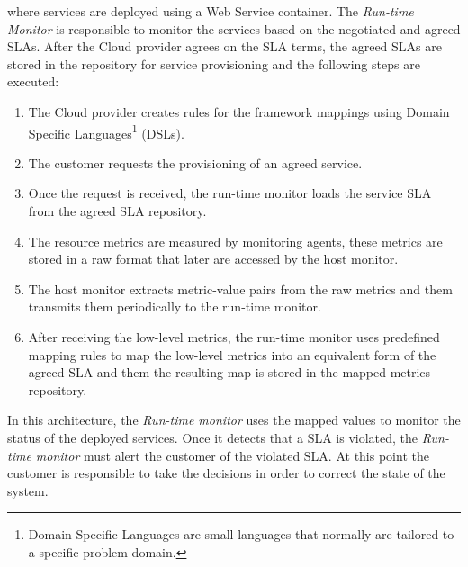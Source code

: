 where services are deployed using a Web Service container. The \textit{Run-time Monitor} is responsible to monitor
the services based on the negotiated and agreed SLAs. After the Cloud provider agrees on the SLA terms, the
agreed SLAs are stored in the repository for service provisioning and the following steps are executed:
\begin{enumerate}
  \item The Cloud provider creates rules for the framework mappings using Domain Specific
  Languages\footnote{Domain Specific Languages are small languages that normally are tailored to a specific
  problem domain.} (DSLs).
  \item The customer requests the provisioning of an agreed service.
  \item Once the request is received, the run-time monitor loads the service SLA from the agreed SLA repository.
  \item The resource metrics are measured by monitoring agents, these metrics are stored in a raw format that
  later are accessed by the host monitor.
  \item The host monitor extracts metric-value pairs from the raw metrics and them transmits them periodically to
  the run-time monitor.
  \item After receiving the low-level metrics, the run-time monitor uses predefined mapping rules to map the
  low-level metrics into an equivalent form of the agreed SLA and them the resulting map is stored in the
  mapped metrics repository.
\end{enumerate}

In this architecture, the \textit{Run-time monitor} uses the mapped values to monitor the status of the deployed services. Once it detects that a SLA is violated, the \textit{Run-time monitor} must alert the customer of the violated SLA.
At this point the customer is responsible to take the decisions in order to correct the state of the system.
